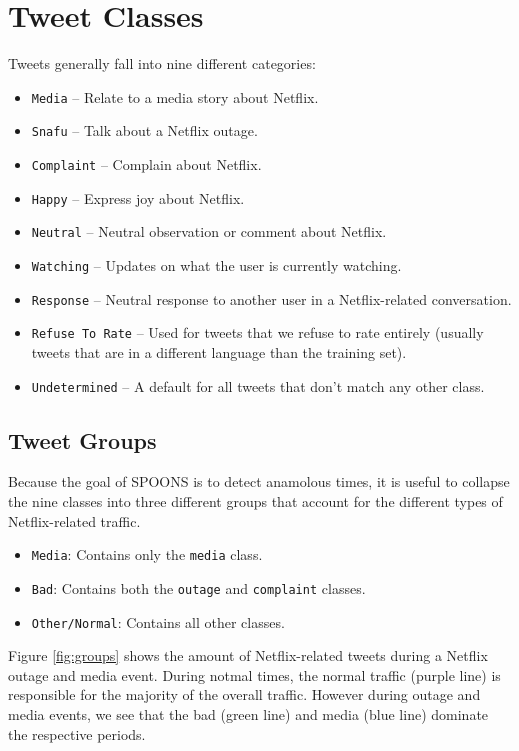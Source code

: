 \documentclass[12pt]{ucthesis}
\begin{document}
\section{Tweet Classes}
\label{class-tweet-classes}
Tweets generally fall into nine different categories:

\begin{itemize}
  \item \texttt{Media} -- Relate to a media story about Netflix.
  \item \texttt{Snafu} -- Talk about a Netflix outage.
  \item \texttt{Complaint} -- Complain about Netflix.
  \item \texttt{Happy} -- Express joy about Netflix.
  \item \texttt{Neutral} -- Neutral observation or comment about Netflix.
  \item \texttt{Watching} -- Updates on what the user is currently watching.
  \item \texttt{Response} -- Neutral response to another user in a Netflix-related conversation.
  \item \texttt{Refuse To Rate} -- Used for tweets that we refuse to rate entirely (usually tweets that are in a different language than the training set).
  \item \texttt{Undetermined} -- A default for all tweets that don't match any other class.
\end{itemize}

\subsection{Tweet Groups}
\label{class-tweet-groups}
Because the goal of SPOONS is to detect anamolous times, it is useful to collapse the nine classes into
three different groups that account for the different types of Netflix-related traffic.

\begin{itemize}
  \item \texttt{Media}: Contains only the \texttt{media} class.
  \item \texttt{Bad}: Contains both the \texttt{outage} and \texttt{complaint} classes.
  \item \texttt{Other/Normal}: Contains all other classes.
\end{itemize}

Figure \ref{fig:groups} shows the amount of Netflix-related tweets during a Netflix outage and media event.
During notmal times, the normal traffic (purple line) is responsible for the majority of the overall traffic.
However during outage and media events, we see that the bad (green line) and media (blue line) dominate the respective
periods.
\end{document}
